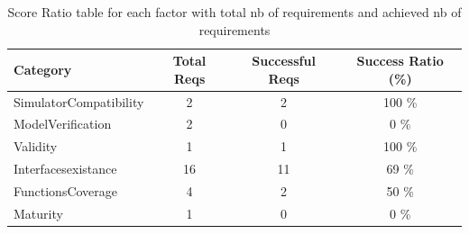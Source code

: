 \documentclass{article}
\begin{document}
						\begin{table}
						\centering
						\caption{Score Ratio table for each factor with total nb of requirements and achieved nb of requirements}
						\begin{tabular}{|l|c|c|c|}
						\hline
						Category & Total Reqs & Successful Reqs & Success Ratio (\%) \\
						\hline

							    SimulatorCompatibility & 2 & 2 & 100 \% \\
							 

							    ModelVerification & 2 & 0 & 0 \% \\
							 

							    Validity & 1 & 1 & 100 \% \\
							 

							    Interfacesexistance & 16 & 11 & 69 \% \\
							 

							    FunctionsCoverage & 4 & 2 & 50 \% \\
							 

							    Maturity & 1 & 0 & 0 \% \\
							 
					
						
						\hline
						\end{tabular}
						\end{table}




										
								

			
\end{document}

